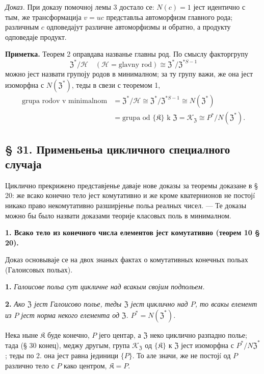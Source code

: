 \documentclass[11pt]{article}
\begin{document}
\noindent\emph{Доказ.} При доказу помочној лемы 3 достало се: \(N(c)=1\) јест идентично с тым, же трансформација \(v=uc\) представльа автоморфизм главного рода; различным \(c\) одповедајут различне автоморфизмы и обратно, а продукту одповедаје продукт.

\noindent\textbf{Приметка.} Теорем 2 оправдава названье главны род. По смыслу факторгрупу
\[
\mathfrak Z^*/\mathscr H
\quad(\mathscr H=\text{glavny rod})
\cong\mathfrak Z^*/\mathfrak Z^{*S-1}
\]
можно јест назвати групоју родов в минималном; за ту групу важи, же она јест изоморфна с \(N(\mathfrak Z^*)\), теды в свези с теоремом 1,
\[
\begin{aligned}
\text{grupa rodov v minimalnom}
&=\mathfrak Z^*/\mathscr H
 \cong\mathfrak Z^*/\mathfrak Z^{*S-1}
 \cong N(\mathfrak Z^*)\\
&=\text{grupa od }\{\mathfrak K\}\text{ k }\mathfrak Z
 =\mathscr K_{\mathfrak Z}
 \cong P^*/N(\mathfrak Z^*).
\end{aligned}
\]

\subsection*{§ 31. Применьеньа цикличного специалного случаја}\label{anwendungen-des-zyklischen-spezialfalles}

Циклично прекрижено представјенье даваје нове доказы за теоремы доказане в § 20: же всако конечно тело јест комутативно и же кроме кватернионов не постојí никако право некомутативно разширјенье польа реалных чисел. --- Те доказы можно бы было назвати доказами теорије класовых поль в минималном.

\noindent\textbf{1. Всако тело из конечного числа елементов јест комутативно (теорем 10 § 20).}

Доказ основываје се на двох знаных фактах о комутативных конечных польах (Галоисовых польах).

\noindent\textbf{1.} \emph{Галоисове польа сут цикличне над всакым својим подпольем.}

\noindent\textbf{2.} \emph{Ако \(\mathfrak Z\) јест Галоисово полье, теды \(\mathfrak Z\) јест циклично над \(P\), то всакы елемент из \(P\) јест норма некого елемента од \(\mathfrak Z\). \(P^*=N(\mathfrak Z^*)\).}

Нека ныне \(\mathfrak K\) буде конечно, \(P\) јего центар, а \(\mathfrak Z\) неко циклично разпадно полье; тада (§ 30 конец), меджу другым, група \(\mathscr K_{\mathfrak Z}\) од \(\{\mathfrak K\}\) к \(\mathfrak Z\) јест изоморфна с \(P^*/N\mathfrak Z^*\); теды по 2. она јест равна јединици \(\{P\}\). То але значи, же не постојí од \(P\) различно тело с \(P\) како центром, \(\mathfrak K=P\).
\end{document}
